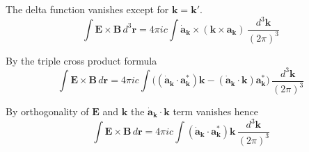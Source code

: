 The delta function vanishes except for $\mathbf k=\mathbf k'$.
\begin{equation*}
\int\mathbf E\times\mathbf B\,d^3\mathbf r
=4\pi ic\int\dot{\mathbf a}_{\mathbf k}\times(\mathbf k\times\mathbf a_{\mathbf k})
\,\frac{d^3\mathbf k}{(2\pi)^3}
\end{equation*}

By the triple cross product formula
\begin{equation*}
\int\mathbf E\times\mathbf B\,d\mathbf r
=4\pi ic\int
\bigl((\dot{\mathbf a}_{\mathbf k}\cdot\mathbf a_{\mathbf k}^*)\mathbf k
-(\dot{\mathbf a}_{\mathbf k}\cdot\mathbf k)\mathbf a_{\mathbf k}^*\bigr)
\,\frac{d^3\mathbf k}{(2\pi)^3}
\end{equation*}

By orthogonality of $\mathbf E$ and $\mathbf k$ the $\dot{\mathbf a}_{\mathbf k}\cdot\mathbf k$
term vanishes hence
\begin{equation*}
\int\mathbf E\times\mathbf B\,d\mathbf r
=4\pi ic\int
(\dot{\mathbf a}_{\mathbf k}\cdot\mathbf a_{\mathbf k}^*)\mathbf k
\,\frac{d^3\mathbf k}{(2\pi)^3}
\end{equation*}



